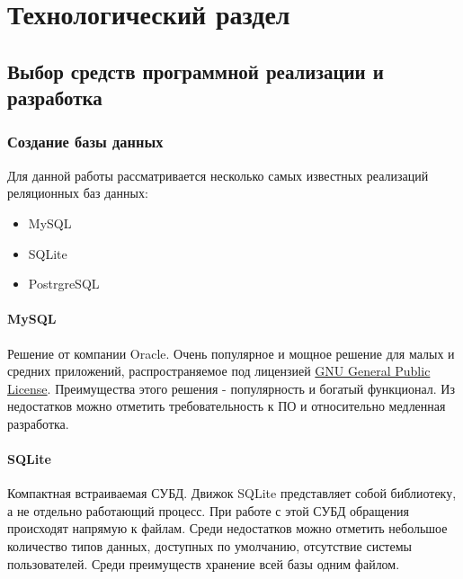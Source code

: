 \chapter{Технологический раздел}

%
\section{Выбор средств программной реализации и разработка}

\subsection{Создание базы данных}

Для данной работы рассматривается несколько самых известных реализаций реляционных баз данных:

\begin{itemize}
    \item MySQL
    \item SQLite
    \item PostrgreSQL
\end{itemize}

\subsubsection{MySQL}

Решение от компании Oracle. Очень популярное и мощное решение для малых и средних приложений, распространяемое под лицензией \href{https://ru.wikipedia.org/wiki/GNU_General_Public_License}{GNU General Public License}. Преимущества этого решения - популярность и богатый функционал. Из недостатков можно отметить требовательность к ПО и относительно медленная разработка.

\subsubsection{SQLite}

Компактная встраиваемая СУБД. Движок SQLite представляет собой библиотеку, а не отдельно работающий процесс. При работе с этой СУБД обращения происходят напрямую к файлам. Среди недостатков можно отметить небольшое количество типов данных, доступных по умолчанию, отсутствие системы пользователей. Среди преимуществ хранение всей базы одним файлом.

